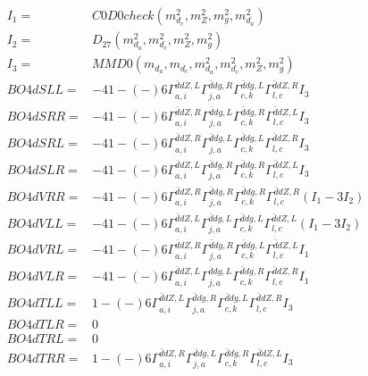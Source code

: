 \documentclass[A4,landscape]{article}
\begin{document}
\begin{align} 
I_1 = & C0D0check(m^2_{d_{{c}}}, m^2_{Z}, m^2_{g}, m^2_{d_{{a}}}) \\ 
I_2 = & D_{27}(m^2_{d_{{a}}}, m^2_{d_{{c}}}, m^2_{Z}, m^2_{g}) \\ 
I_3 = & MMD0(m_{d_{{a}}}, m_{d_{{c}}}, m^2_{d_{{a}}}, m^2_{d_{{c}}}, m^2_{Z}, m^2_{g}) \\ 
  BO4dSLL= & -4   1
-(-)
  6 \Gamma^{\bar{d}d Z ,L}_{a, i} \Gamma^{\bar{d}d g ,R}_{j, a} \Gamma^{\bar{d}d g ,L}_{c, k} \Gamma^{\bar{d}d Z ,R}_{l, c} I_3 \\ 
  BO4dSRR= & -4   1
-(-)
  6 \Gamma^{\bar{d}d Z ,R}_{a, i} \Gamma^{\bar{d}d g ,L}_{j, a} \Gamma^{\bar{d}d g ,R}_{c, k} \Gamma^{\bar{d}d Z ,L}_{l, c} I_3 \\ 
  BO4dSRL= & -4   1
-(-)
  6 \Gamma^{\bar{d}d Z ,R}_{a, i} \Gamma^{\bar{d}d g ,L}_{j, a} \Gamma^{\bar{d}d g ,L}_{c, k} \Gamma^{\bar{d}d Z ,R}_{l, c} I_3 \\ 
  BO4dSLR= & -4   1
-(-)
  6 \Gamma^{\bar{d}d Z ,L}_{a, i} \Gamma^{\bar{d}d g ,R}_{j, a} \Gamma^{\bar{d}d g ,R}_{c, k} \Gamma^{\bar{d}d Z ,L}_{l, c} I_3 \\ 
  BO4dVRR= & -4   1
-(-)
  6 \Gamma^{\bar{d}d Z ,R}_{a, i} \Gamma^{\bar{d}d g ,R}_{j, a} \Gamma^{\bar{d}d g ,R}_{c, k} \Gamma^{\bar{d}d Z ,R}_{l, c} (I_1 - 3 I_2) \\ 
  BO4dVLL= & -4   1
-(-)
  6 \Gamma^{\bar{d}d Z ,L}_{a, i} \Gamma^{\bar{d}d g ,L}_{j, a} \Gamma^{\bar{d}d g ,L}_{c, k} \Gamma^{\bar{d}d Z ,L}_{l, c} (I_1 - 3 I_2) \\ 
  BO4dVRL= & -4   1
-(-)
  6 \Gamma^{\bar{d}d Z ,R}_{a, i} \Gamma^{\bar{d}d g ,R}_{j, a} \Gamma^{\bar{d}d g ,L}_{c, k} \Gamma^{\bar{d}d Z ,L}_{l, c} I_1 \\ 
  BO4dVLR= & -4   1
-(-)
  6 \Gamma^{\bar{d}d Z ,L}_{a, i} \Gamma^{\bar{d}d g ,L}_{j, a} \Gamma^{\bar{d}d g ,R}_{c, k} \Gamma^{\bar{d}d Z ,R}_{l, c} I_1 \\ 
  BO4dTLL= &   1
-(-)
  6 \Gamma^{\bar{d}d Z ,L}_{a, i} \Gamma^{\bar{d}d g ,R}_{j, a} \Gamma^{\bar{d}d g ,L}_{c, k} \Gamma^{\bar{d}d Z ,R}_{l, c} I_3 \\ 
  BO4dTLR= & 0 \\ 
  BO4dTRL= & 0 \\ 
  BO4dTRR= &   1
-(-)
  6 \Gamma^{\bar{d}d Z ,R}_{a, i} \Gamma^{\bar{d}d g ,L}_{j, a} \Gamma^{\bar{d}d g ,R}_{c, k} \Gamma^{\bar{d}d Z ,L}_{l, c} I_3 \\ 
\end{align} 
\end{document}
